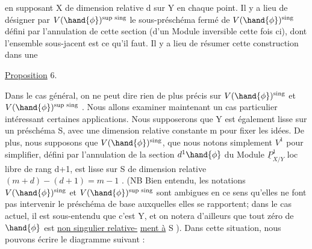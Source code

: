 
en supposant X de dimension relative d sur Y en chaque point.  Il y a
lieu de  désigner par  $V(\hand{\phi})^{\text{sup sing}}$ le sous-préschéma fermé de
 $V(\hand{\phi})^{\text{sing}}$  défini par l'annulation de cette section (d'un Module
inversible cette fois ci),  dont l'ensemble  sous-jacent est ce qu'il
faut. Il y a lieu de\margin{\unsure{$/\,/$}} résumer cette construction dans une

\uline{Proposition} 6.

Dans le cas général, on ne peut  dire rien de plus précis sur
$V(\hand{\phi})^{\text{sing}}$ et $V(\hand{\phi})^{\text{sup sing}}$ .  Nous allons  examiner maintenant un cas
particulier\hand{,} intéressant  certaines applications. Nous supposerons
que Y est également lisse sur un préschéma S, avec une dimension relative
constante m pour fixer les idées.  De plus, nous supposons que $V(\hand{\phi})^{\text{sing}}$,
que nous notons simplement $V^1$ pour simplifier, défini  par l'annulation
de la section $d^1\hand{\phi}$  du Module $\underline{P}^1_{X/Y}$  loc libre de  rang d+1,
est  lisse sur S de dimension relative  $(m+d) - (d+1) = m-1$ . (NB  Bien
entendu, les notations $V(\hand{\phi})^{\text{sing}}$ et $V(\hand{\phi})^{\text{sup sing}}$ sont ambigues en ce sens
qu'elles ne font pas intervenir le préschéma de base  auxquelles elles
se rapportent; dans le cas actuel,  il est sous-entendu que c'est Y,
et on notera d'ailleurs  que tout zéro de $\hand{\phi}$  est \uline{non singulier relative-}%
\uline{ment à} S ).  Dans cette situation, nous pouvons écrire  le diagramme
suivant  :

